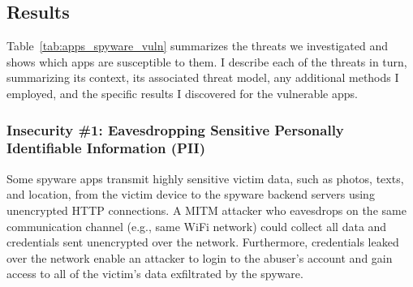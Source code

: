 \subsection{Results}

Table~\ref{tab:apps_spyware_vuln} summarizes the threats we
investigated and shows which apps are susceptible to them.
%
I describe each of the threats in turn, summarizing its context, its
associated threat model, any additional methods I employed, and the
specific results I discovered for the vulnerable apps.




\subsubsection*{Insecurity \#1: Eavesdropping Sensitive Personally Identifiable Information (PII)}

Some spyware apps transmit highly sensitive victim data, such as photos,
texts, and location, from the victim device to the spyware backend
servers using unencrypted HTTP connections.  A MITM attacker who
eavesdrops on the same communication channel (e.g., same WiFi network)
could collect all data and credentials sent unencrypted
over the network.  Furthermore, credentials leaked over the network enable
an attacker to login to the abuser's account and gain access to all of
the victim's data exfiltrated by the spyware.

